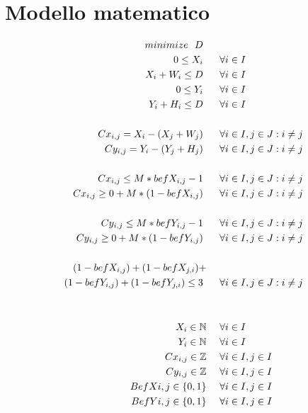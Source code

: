 


	\section{Modello matematico}


\begin{align*}	%
minimize \ \ D       \ \ \ \ \   & \\	%
%
0 \leq X_i           \ \ \ \ \   &\forall{ i \in I} \\
X_i +W_i \leq D      \ \ \ \ \   &\forall{ i \in I} \\
0 \leq Y_i           \ \ \ \ \   &\forall{ i \in I} \\
Y_i +H_i \leq D      \ \ \ \ \   &\forall{ i \in I} \\ \\
%
%
Cx_{i,j} = X_i - (X_j + W_j)       \ \ \ \ \   &\forall{ i \in I, j \in J: i \neq j} \\
Cy_{i,j} = Y_i - (Y_j + H_j)       \ \ \ \ \   &\forall{ i \in I, j \in J: i \neq j} \\ \\
%
%
Cx_{i,j} \leq M *befX_{i,j} -1           \ \ \ \ \   &\forall{ i \in I, j \in J: i \neq j} \\
Cx_{i,j} \geq 0 + M*(1-befX_{i,j})       \ \ \ \ \   &\forall{ i \in I, j \in J: i \neq j} \\ \\
%
%
Cy_{i,j} \leq M *befY_{i,j} -1           \ \ \ \ \   &\forall{ i \in I, j \in J: i \neq j} \\
Cy_{i,j} \geq 0 + M*(1-befY_{i,j})       \ \ \ \ \   &\forall{ i \in I, j \in J: i \neq j} \\ \\
%
%
(1-befX_{i,j})+(1-befX_{j,i})+ \ \ \ \ & \\ (1-befY_{i,j})+(1-befY_{j,i}) \leq 3       \ \ \ \ \   &\forall{ i \in I, j \in J: i \neq j} \\ \\
%
%
%
\\
X_i \in \NaturalSet      \ \ \ \ &\forall{i \in I} \\
Y_i \in \NaturalSet      \ \ \ \ &\forall{i \in I} \\
Cx_{i,j} \in \IntegerSet \ \ \ \ &\forall{i \in I,j \in I} \\
Cy_{i,j} \in \IntegerSet \ \ \ \ &\forall{i \in I,j \in I} \\
BefX{i,j} \in \BinSet    \ \ \ \ &\forall{i \in I,j \in I} \\
BefY{i,j} \in \BinSet    \ \ \ \ &\forall{i \in I,j \in I} 
%
 \end{align*}


